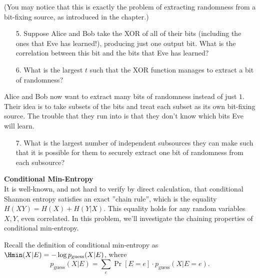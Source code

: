 \begin{exercises}
(You may notice that this is exactly the problem of extracting randomness from a bit-fixing source, as introduced in the chapter.)
\begin{enumerate}
\item[5.] Suppose Alice and Bob take the XOR of all of their bits (including the ones that Eve has learned!), producing just one output bit. What is the correlation between this bit and the bits that Eve has learned?
\item[6.] What is the largest $t$ such that the XOR function manages to extract a bit of randomness?
\end{enumerate}
Alice and Bob now want to extract many bits of randomness instead of just $1$. Their idea is to take subsets of the bits and treat each subset as its own bit-fixing source. The trouble that they run into is that they don't know which bits Eve will learn.
\begin{enumerate}
\item[7.] What is the largest number of independent subsources they can make such that it is possible for them to securely extract one bit of randomness from each subsource?
\end{enumerate}

\item {\bf Conditional Min-Entropy}\\
It is well-known, and not hard to verify by direct calculation, that conditional Shannon entropy satisfies an exact ''chain rule'', which is the equality $H(XY) = H(X) + H(Y| X)$. This equality holds for any random variables $X,Y$, even correlated. In this problem, we'll investigate the chaining properties of conditional min-entropy.

Recall the definition of conditional min-entropy as $\Hmin(X| E) = -\log p_\text{guess}(X| E)$, where
\[
 p_\text{guess}(X| E) = \sum_e \operatorname{Pr}[E=e]\cdot p_\text{guess}(X| E = e).
\]


\end{exercises}
